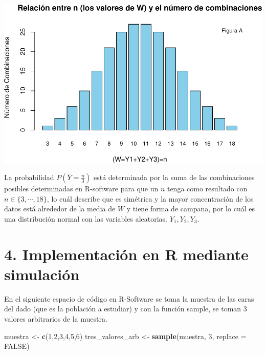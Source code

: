 \documentclass[
]{article}
\newenvironment{Shaded}{\begin{snugshade}}{\end{snugshade}}
\newcommand{\AttributeTok}[1]{\textcolor[rgb]{0.13,0.29,0.53}{#1}}
\newcommand{\ConstantTok}[1]{\textcolor[rgb]{0.56,0.35,0.01}{#1}}
\newcommand{\DecValTok}[1]{\textcolor[rgb]{0.00,0.00,0.81}{#1}}
\newcommand{\FunctionTok}[1]{\textcolor[rgb]{0.13,0.29,0.53}{\textbf{#1}}}
\newcommand{\NormalTok}[1]{#1}
\newcommand{\OtherTok}[1]{\textcolor[rgb]{0.56,0.35,0.01}{#1}}
\begin{document}
\includegraphics{inferencia_files/figure-latex/Figura (A)-1.pdf}

La probabilidad $\displaystyle P(\bar{Y}=\frac{n}{3})$ está determinada por la suma de las combinaciones posibles determinadas en R-software para que un $n$ tenga como resultado con $n \in \{3, \cdots, 18 \}$, lo cuál describe que es simétrica y la mayor concentración de los datos está alrededor de la media de $W$ y tiene forma de campana, por lo cuál es una distribución normal con las variables aleatorias. $Y_{1},Y_{2},Y_{3}$. 

\hypertarget{implementaciuxf3n-en-r-mediante-simulaciuxf3n}{%
\section{4. Implementación en R mediante
simulación}\label{implementaciuxf3n-en-r-mediante-simulaciuxf3n}}

En el siguiente espacio de código en R-Software se toma la muestra de las caras del dado (que es la población a estudiar) y con la función sample, se toman 3 valores arbitrarios de la muestra.

\newpage 

\begin{Shaded}
\begin{Highlighting}[]
\NormalTok{muestra }\OtherTok{\textless{}{-}} \FunctionTok{c}\NormalTok{(}\DecValTok{1}\NormalTok{,}\DecValTok{2}\NormalTok{,}\DecValTok{3}\NormalTok{,}\DecValTok{4}\NormalTok{,}\DecValTok{5}\NormalTok{,}\DecValTok{6}\NormalTok{)}
\NormalTok{tres\_valores\_arb }\OtherTok{\textless{}{-}} \FunctionTok{sample}\NormalTok{(muestra, }\DecValTok{3}\NormalTok{, }\AttributeTok{replace =} \ConstantTok{FALSE}\NormalTok{)}
\end{Highlighting}
\end{Shaded}
\end{document}
